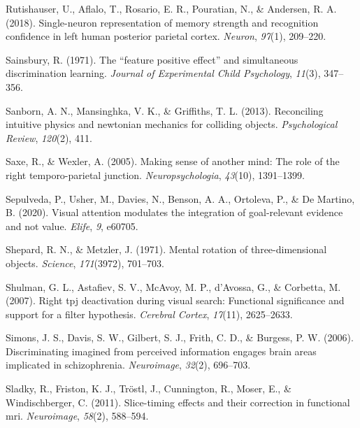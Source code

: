 \documentclass[12pt,twoside]{reedthesis}
\begin{document}
\leavevmode\hypertarget{ref-rutishauser2018single}{}%
Rutishauser, U., Aflalo, T., Rosario, E. R., Pouratian, N., \& Andersen, R. A. (2018). Single-neuron representation of memory strength and recognition confidence in left human posterior parietal cortex. \emph{Neuron}, \emph{97}(1), 209--220.

\leavevmode\hypertarget{ref-sainsbury1971feature}{}%
Sainsbury, R. (1971). The ``feature positive effect'' and simultaneous discrimination learning. \emph{Journal of Experimental Child Psychology}, \emph{11}(3), 347--356.

\leavevmode\hypertarget{ref-sanborn2013reconciling}{}%
Sanborn, A. N., Mansinghka, V. K., \& Griffiths, T. L. (2013). Reconciling intuitive physics and newtonian mechanics for colliding objects. \emph{Psychological Review}, \emph{120}(2), 411.

\leavevmode\hypertarget{ref-saxe2005making}{}%
Saxe, R., \& Wexler, A. (2005). Making sense of another mind: The role of the right temporo-parietal junction. \emph{Neuropsychologia}, \emph{43}(10), 1391--1399.

\leavevmode\hypertarget{ref-sepulveda2020visual}{}%
Sepulveda, P., Usher, M., Davies, N., Benson, A. A., Ortoleva, P., \& De Martino, B. (2020). Visual attention modulates the integration of goal-relevant evidence and not value. \emph{Elife}, \emph{9}, e60705.

\leavevmode\hypertarget{ref-shepard1971mental}{}%
Shepard, R. N., \& Metzler, J. (1971). Mental rotation of three-dimensional objects. \emph{Science}, \emph{171}(3972), 701--703.

\leavevmode\hypertarget{ref-shulman2007right}{}%
Shulman, G. L., Astafiev, S. V., McAvoy, M. P., d'Avossa, G., \& Corbetta, M. (2007). Right tpj deactivation during visual search: Functional significance and support for a filter hypothesis. \emph{Cerebral Cortex}, \emph{17}(11), 2625--2633.

\leavevmode\hypertarget{ref-simons2006discriminating}{}%
Simons, J. S., Davis, S. W., Gilbert, S. J., Frith, C. D., \& Burgess, P. W. (2006). Discriminating imagined from perceived information engages brain areas implicated in schizophrenia. \emph{Neuroimage}, \emph{32}(2), 696--703.

\leavevmode\hypertarget{ref-sladky2011slice}{}%
Sladky, R., Friston, K. J., Tröstl, J., Cunnington, R., Moser, E., \& Windischberger, C. (2011). Slice-timing effects and their correction in functional mri. \emph{Neuroimage}, \emph{58}(2), 588--594.
\end{document}
